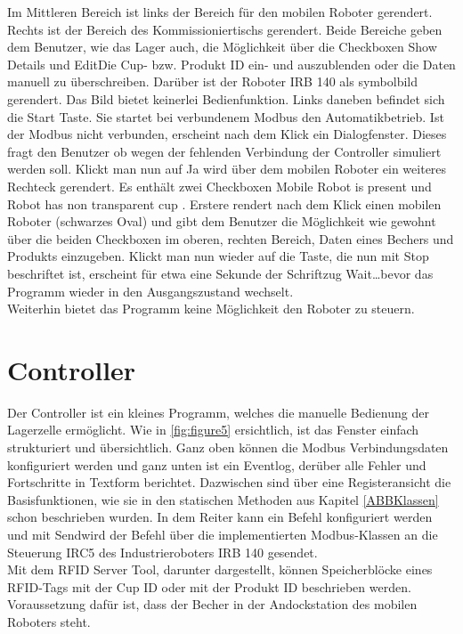 Im Mittleren Bereich ist links der Bereich für den mobilen Roboter gerendert.
Rechts ist der Bereich des Kommissioniertischs gerendert.
Beide Bereiche geben dem Benutzer, wie das Lager auch, die Möglichkeit über die Checkboxen \glqq Show Details \grqq
und \glqq Edit\grqq Die Cup- bzw. Produkt ID ein- und auszublenden oder die Daten manuell zu überschreiben.
Darüber ist der Roboter IRB 140 als symbolbild gerendert.
Das Bild bietet keinerlei Bedienfunktion.
Links daneben befindet sich die \glqq Start \grqq Taste.
Sie startet bei verbundenem Modbus den Automatikbetrieb.
Ist der Modbus nicht verbunden, erscheint nach dem Klick ein Dialogfenster.
Dieses fragt den Benutzer ob wegen der fehlenden Verbindung der Controller simuliert werden soll.
Klickt man nun auf \glqq Ja \grqq wird über dem mobilen Roboter ein weiteres Rechteck gerendert.
Es enthält zwei Checkboxen \glqq Mobile Robot is present \grqq und \glqq Robot has non transparent cup \grqq.
Erstere rendert nach dem Klick einen mobilen Roboter (schwarzes Oval) und gibt dem Benutzer die Möglichkeit
wie gewohnt über die beiden Checkboxen im oberen, rechten Bereich, Daten eines Bechers und Produkts einzugeben.
Klickt man nun wieder auf die Taste, die nun mit \glqq Stop \grqq beschriftet ist, erscheint für etwa eine Sekunde
der Schriftzug \glqq Wait\ldots \grqq bevor das Programm wieder in den Ausgangszustand wechselt.\\

Weiterhin bietet das Programm keine Möglichkeit den Roboter zu steuern.

\newpage
\section {Controller}

Der Controller ist ein kleines Programm, welches die manuelle Bedienung der Lagerzelle ermöglicht.
Wie in \ref{fig:figure5} ersichtlich, ist das Fenster einfach strukturiert und übersichtlich.
Ganz oben können die Modbus Verbindungsdaten konfiguriert werden und ganz unten ist ein Eventlog, derüber alle Fehler und
Fortschritte in Textform berichtet.
Dazwischen sind über eine Registeransicht die Basisfunktionen, wie sie in den statischen Methoden aus Kapitel
\ref{ABBKlassen} schon beschrieben wurden.
In dem Reiter kann ein Befehl konfiguriert werden und mit \glqq Send\grqq wird der Befehl
über die implementierten Modbus-Klassen an die Steuerung IRC5 des Industrieroboters IRB 140 gesendet.\\

Mit dem RFID Server Tool, darunter dargestellt, können Speicherblöcke eines RFID-Tags mit der Cup ID oder mit der Produkt ID
beschrieben werden.
Voraussetzung dafür ist, dass der Becher in der Andockstation des mobilen Roboters steht.

